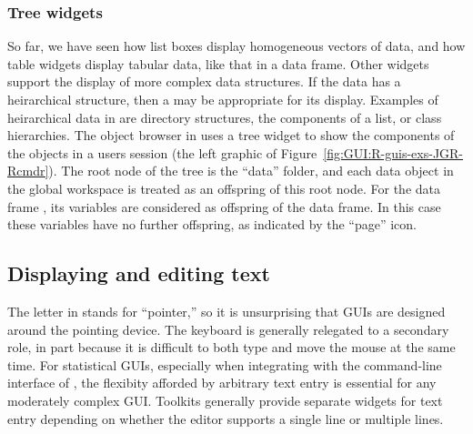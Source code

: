     

\subsubsection{Tree widgets}
\label{sec:GUI:tree-widgets}

So far, we have seen how list boxes display homogeneous vectors of
data, and how table widgets display tabular data, like that in a data
frame. Other widgets support the display of more complex data
structures. If the data has a heirarchical structure, then a  may be appropriate for its display. Examples of heirarchical
data in \R\/ are directory structures, the components of a list, or
class hierarchies. The object browser in  uses a tree
widget to show the components of the objects in a users session (the
left graphic of Figure~\ref{fig:GUI:R-guis-exs-JGR-Rcmdr}). The root
node of the tree is the ``data'' folder, and each data object in the
global workspace is treated as an offspring of this root node. For the
data frame , its variables are considered as offspring of
the data frame. In this case these variables have no further
offspring, as indicated by the ``page'' icon.

\subsection{Displaying and editing text}
\label{sec:GUI:text-widgets}

The letter  in  stands for ``pointer,'' so it
is unsurprising that  GUIs are designed around the
pointing device. The keyboard is generally relegated to a secondary
role, in part because it is difficult to both type and move the mouse
at the same time. For statistical GUIs, especially when integrating
with the command-line interface of \R\/, the flexibity afforded by
arbitrary text entry is essential for any moderately complex
GUI. Toolkits generally provide separate widgets for text entry
depending on whether the editor supports a single line or multiple
lines.

